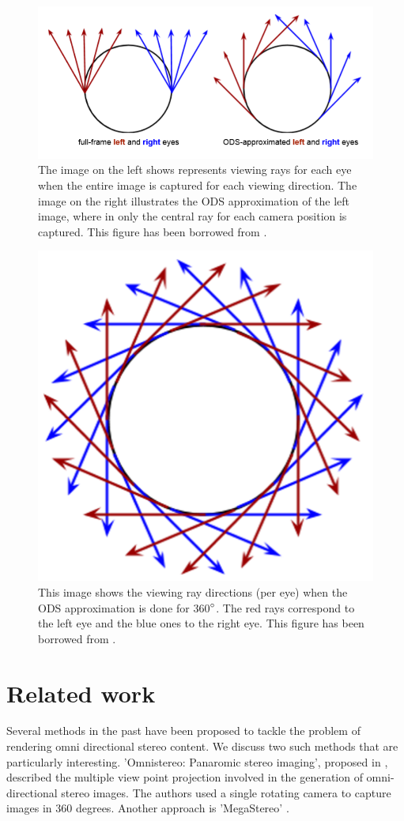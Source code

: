\documentclass[10pt,twocolumn,letterpaper]{article}
\begin{document}
\begin{figure}[t]
\begin{center}
	\includegraphics[width=0.8\linewidth]{pictures/approxi.png}
\end{center}
   \caption{The image on the left shows represents viewing rays for each eye when the entire image is captured for each viewing direction. The image on the right illustrates the ODS approximation of the left image, where in only the central ray for each camera position is captured. This figure has been borrowed from \cite{ods}.}
\label{approx}
\end{figure}

\begin{figure}[t]
\begin{center}
   \includegraphics[width=0.5\linewidth]{pictures/ods.png}
\end{center}
   \caption{This image shows the viewing ray directions (per eye) when the ODS approximation is done for 360$\degree$. The red rays correspond to the left eye and the blue ones to the right eye. This figure has been borrowed from \cite{ods}.}
\label{ods}
\end{figure}


\section{Related work}
\label{related-work}
Several methods in the past have been proposed to tackle the problem of rendering omni directional stereo content. We discuss two such methods that are particularly interesting. 'Omnistereo: Panaromic stereo imaging', proposed in \cite{peleg}, described the multiple view point projection involved in the generation of omni-directional stereo images. The authors used a single rotating camera to capture images in 360 degrees. Another approach is 'MegaStereo' \cite{megastereo}. 
\end{document}
